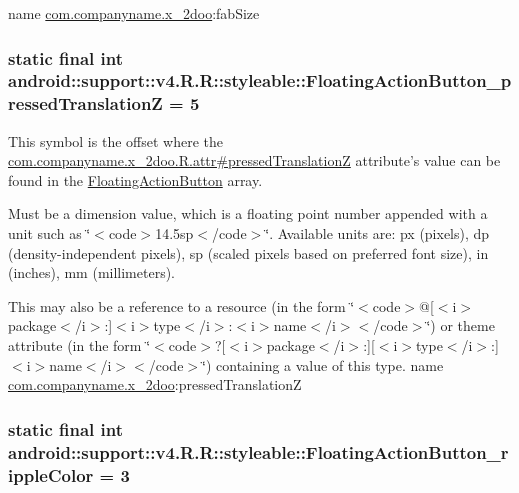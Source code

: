 name \hyperlink{namespacecom_1_1companyname_1_1x__2doo}{com.companyname.x\_\-2doo}:fabSize \hypertarget{classandroid_1_1support_1_1v4_1_1_r_1_1styleable_c267ca537f8a9cb13d80afdbd16d457d}{
\subsubsection[{FloatingActionButton\_\-pressedTranslationZ}]{\setlength{\rightskip}{0pt plus 5cm}static final int android::support::v4.R.R::styleable::FloatingActionButton\_\-pressedTranslationZ = 5}}
\label{classandroid_1_1support_1_1v4_1_1_r_1_1styleable_c267ca537f8a9cb13d80afdbd16d457d}


This symbol is the offset where the \hyperlink{classcom_1_1companyname_1_1x__2doo_1_1_r_1_1attr_202170b7607fdf0e1a095a25cd1f11e7}{com.companyname.x\_\-2doo.R.attr\#pressedTranslationZ} attribute's value can be found in the \hyperlink{classandroid_1_1support_1_1v4_1_1_r_1_1styleable_51a0276d7190a1195d58170b1623ab3c}{FloatingActionButton} array.

Must be a dimension value, which is a floating point number appended with a unit such as \char`\"{}$<$code$>$14.5sp$<$/code$>$\char`\"{}. Available units are: px (pixels), dp (density-independent pixels), sp (scaled pixels based on preferred font size), in (inches), mm (millimeters). 

This may also be a reference to a resource (in the form \char`\"{}$<$code$>$@\mbox{[}$<$i$>$package$<$/i$>$:\mbox{]}$<$i$>$type$<$/i$>$:$<$i$>$name$<$/i$>$$<$/code$>$\char`\"{}) or theme attribute (in the form \char`\"{}$<$code$>$?\mbox{[}$<$i$>$package$<$/i$>$:\mbox{]}\mbox{[}$<$i$>$type$<$/i$>$:\mbox{]}$<$i$>$name$<$/i$>$$<$/code$>$\char`\"{}) containing a value of this type.  name \hyperlink{namespacecom_1_1companyname_1_1x__2doo}{com.companyname.x\_\-2doo}:pressedTranslationZ \hypertarget{classandroid_1_1support_1_1v4_1_1_r_1_1styleable_a03ae583d77273636cb0e624e75b3148}{
\subsubsection[{FloatingActionButton\_\-rippleColor}]{\setlength{\rightskip}{0pt plus 5cm}static final int android::support::v4.R.R::styleable::FloatingActionButton\_\-rippleColor = 3}}
\label{classandroid_1_1support_1_1v4_1_1_r_1_1styleable_a03ae583d77273636cb0e624e75b3148}


